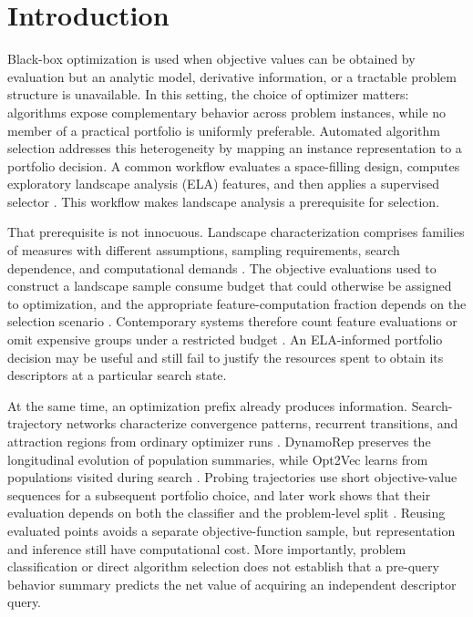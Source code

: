 \section{Introduction}
\label{sec:introduction}

Black-box optimization is used when objective values can be obtained by evaluation but an analytic model, derivative information, or a tractable problem structure is unavailable. In this setting, the choice of optimizer matters: algorithms expose complementary behavior across problem instances, while no member of a practical portfolio is uniformly preferable. Automated algorithm selection addresses this heterogeneity by mapping an instance representation to a portfolio decision. A common workflow evaluates a space-filling design, computes exploratory landscape analysis (ELA) features, and then applies a supervised selector \cite{kerschkeAutomatedAlgorithmSelection2019,guoAutomatedAlgorithmSelection2025}. This workflow makes landscape analysis a prerequisite for selection.

That prerequisite is not innocuous. Landscape characterization comprises families of measures with different assumptions, sampling requirements, search dependence, and computational demands \cite{malanSurveyTechniquesCharacterising2013,pragerPflaccoFeaturebasedLandscape2024}. The objective evaluations used to construct a landscape sample consume budget that could otherwise be assigned to optimization, and the appropriate feature-computation fraction depends on the selection scenario \cite{blomInfluenceFeatureComputation2026}. Contemporary systems therefore count feature evaluations or omit expensive groups under a restricted budget \cite{guoAutomatedAlgorithmSelection2025}. An ELA-informed portfolio decision may be useful and still fail to justify the resources spent to obtain its descriptors at a particular search state.

At the same time, an optimization prefix already produces information. Search-trajectory networks characterize convergence patterns, recurrent transitions, and attraction regions from ordinary optimizer runs \cite{ochoaSearchTrajectoryNetworks2021}. DynamoRep preserves the longitudinal evolution of population summaries, while Opt2Vec learns from populations visited during search \cite{cenikjDynamoRepTrajectoryBasedPopulation2023,korosecOpt2VecContinuousOptimization2024}. Probing trajectories use short objective-value sequences for a subsequent portfolio choice, and later work shows that their evaluation depends on both the classifier and the problem-level split \cite{renauUtilityProbingTrajectories2024,renauAlgorithmSelectionProbing2025b}. Reusing evaluated points avoids a separate objective-function sample, but representation and inference still have computational cost. More importantly, problem classification or direct algorithm selection does not establish that a pre-query behavior summary predicts the net value of acquiring an independent descriptor query.

